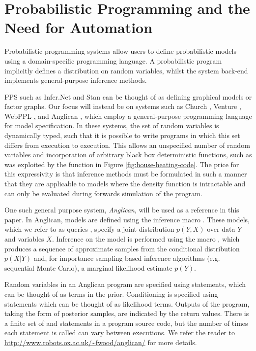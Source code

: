
\chapter{Probabilistic Programming and the Need for Automation}
\label{chp:probprog}

Probabilistic programming systems allow users to define probabilistic models using a domain-specific programming language. A probabilistic program implicitly defines a distribution on random variables, whilst the system back-end implements general-purpose inference methods.  

PPS such as Infer.Net \citep{minka_software_2010} and Stan \citep{carpenter2015stan} can be thought of as defining graphical models or factor graphs.  Our focus will instead be on systems such as Church \citep{goodman_uai_2008}, Venture \citep{mansinghka2014venture}, WebPPL \citep{goodman_book_2014}, and Anglican \citep{wood2014new}, which employ a general-purpose programming language for model specification. In these systems, the set of random variables is dynamically typed, such that it is possible to write programs in which this set differs from execution to execution.  This allows an unspecified number of random variables and incorporation of arbitrary black box deterministic functions, such as was exploited by the \simulatec function in Figure \ref{fig:house-heating-code}. The price for this expressivity is that inference methods must be formulated in such a manner that they are applicable to models where the density function is intractable and can only be evaluated during forwards simulation of the program. 

One such general purpose system, \emph{Anglican}, will be used as a reference in this paper.  In Anglican, models are defined using the inference macro . These models, which we refer to as queries \citep{goodman_uai_2008}, specify a joint distribution $p(Y,X)$ over data $Y$ and variables $X$. Inference on the model is performed using the macro \doquery, which produces a sequence of approximate samples from the conditional distribution $p(X|Y)$ and, for importance sampling based inference algorithms (e.g. sequential Monte Carlo), a marginal likelihood estimate $p(Y)$.  

Random variables in an Anglican program are specified using \sample statements, which can be thought of as terms in the prior. Conditioning is specified using \observe statements which can be thought of as likelihood terms.  Outputs of the program, taking the form of posterior samples, are indicated by the return values.  There is a finite set of \sample and \observe statements in a program source code, but the number of times each statement is called can vary between executions.  We refer the reader to  \href{http://www.robots.ox.ac.uk/~fwood/anglican/}{\small\url{http://www.robots.ox.ac.uk/~fwood/anglican/}} for more details.

